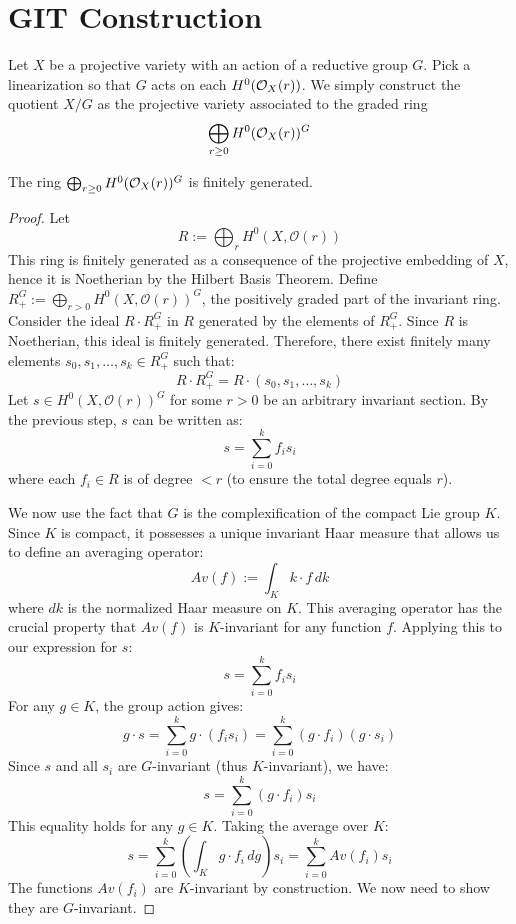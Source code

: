 \documentclass[12pt]{article}
\begin{document}
\section{GIT Construction}
Let $X$ be a projective variety with an action of a reductive group $G$. Pick a linearization so that $G$ acts on each $H^0({\mathcal{O}}_X(r))$. We simply construct the quotient $X/G$ as the projective variety associated to the graded ring \begin{align*}
    \bigoplus_{r \geq 0} H^0({\mathcal{O}}_X(r))^G
\end{align*}
\begin{lemma}
    The ring $\bigoplus_{r \geq 0} H^0({\mathcal{O}}_X(r))^G$ is finitely generated.
\end{lemma}
\begin{proof}
    Let \[R := \bigoplus_{r} H^0(X, \mathcal{O}(r))\] This ring is finitely generated as a consequence of the projective embedding of $X$, hence it is Noetherian by the Hilbert Basis Theorem.
    Define $R_+^G := \bigoplus_{r>0} H^0(X, \mathcal{O}(r))^G$, the positively graded part of the invariant ring. Consider the ideal $R \cdot R_+^G$ in $R$ generated by the elements of $R_+^G$. Since $R$ is Noetherian, this ideal is finitely generated. Therefore, there exist finitely many elements $s_0, s_1, \ldots, s_k \in R_+^G$ such that:
    \[R \cdot R_+^G = R \cdot (s_0, s_1, \ldots, s_k)\]
    Let $s \in H^0(X, \mathcal{O}(r))^G$ for some $r > 0$ be an arbitrary invariant section. By the previous step, $s$ can be written as:
    \[s = \sum_{i=0}^k f_i s_i\]
    where each $f_i \in R$ is of degree $< r$ (to ensure the total degree equals $r$).

    We now use the fact that $G$ is the complexification of the compact Lie group $K$. Since $K$ is compact, it possesses a unique invariant Haar measure that allows us to define an averaging operator:
    \[Av(f) := \int_K k \cdot f \, dk\]
    where $dk$ is the normalized Haar measure on $K$. This averaging operator has the crucial property that $Av(f)$ is $K$-invariant for any function $f$. Applying this to our expression for $s$:
    \[s = \sum_{i=0}^k f_i s_i\]
    For any $g \in K$, the group action gives:
    \[g \cdot s = \sum_{i=0}^k g \cdot (f_i s_i) = \sum_{i=0}^k (g \cdot f_i)(g \cdot s_i)\]
    Since $s$ and all $s_i$ are $G$-invariant (thus $K$-invariant), we have:
    \[s = \sum_{i=0}^k (g \cdot f_i) s_i\]
    This equality holds for any $g \in K$. Taking the average over $K$:
    \[s = \sum_{i=0}^k \left(\int_K g \cdot f_i \, dg \right) s_i = \sum_{i=0}^k Av(f_i) s_i\]
    The functions $Av(f_i)$ are $K$-invariant by construction. We now need to show they are $G$-invariant.


\end{proof}
\end{document}
